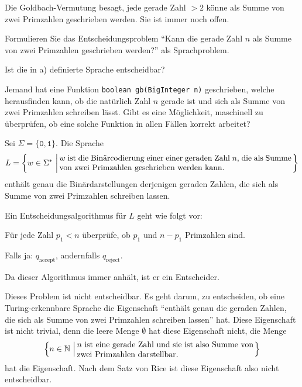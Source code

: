 Die Goldbach-Vermutung besagt, jede gerade Zahl $> 2$ könne als Summe von
zwei Primzahlen geschrieben werden. Sie ist immer noch offen.
\begin{teilaufgaben}
\item Formulieren Sie das Entscheidungsproblem ``Kann die gerade Zahl $n$
als Summe von zwei Primzahlen geschrieben werden?'' als Sprachproblem.
\item Ist die in a) definierte Sprache entscheidbar?
\item Jemand hat eine Funktion \texttt{boolean gb(BigInteger n)} geschrieben,
welche herausfinden kann, ob die natürlich Zahl $n$ gerade ist und sich
als Summe von zwei Primzahlen schreiben lässt. Gibt es eine Möglichkeit,
maschinell zu überprüfen, ob eine solche Funktion in allen Fällen
korrekt arbeitet?
\end{teilaufgaben}


\begin{loesung}
\begin{teilaufgaben}
\item Sei $\Sigma=\{\texttt{0},\texttt{1}\}$. Die Sprache
\[
L=\left\{ w\in\Sigma^*\,\left|\, \begin{minipage}{4truein}
$w$ ist die Binärcodierung einer einer geraden Zahl $n$, die
als Summe von zwei Primzahlen geschrieben werden kann.
\end{minipage}
\right.\right\}
\]
enthält genau die Binärdarstellungen derjenigen geraden Zahlen,
die sich als Summe von zwei Primzahlen schreiben lassen.
\item Ein Entscheidungsalgorithmus für $L$ geht wie folgt vor:
\begin{compactenum}
\item Für jede Zahl $p_1<n$ überprüfe, ob $p_1$ und $n-p_1$ Primzahlen
sind.
\item Falls ja: $q_{\text{accept}}$, andernfalls $q_{\text{reject}}$.
\end{compactenum}
Da dieser Algorithmus immer anhält, ist er ein Entscheider.
\item Dieses Problem ist nicht entscheidbar.
Es geht darum, zu entscheiden, ob eine Turing-erkennbare Sprache
die Eigenschaft
``enthält genau die geraden Zahlen, die sich als Summe von zwei Primzahlen
schreiben lassen''
hat.
Diese Eigenschaft ist nicht trivial, denn die leere Menge $\emptyset$ hat
diese Eigenschaft nicht, die Menge
\[
\left\{ n\in\mathbb N\,\left|\,
\begin{minipage}{3truein}
$n$ ist eine gerade Zahl und sie ist also Summe von zwei Primzahlen
darstellbar.
\end{minipage}\right.\right\}
\]
hat die Eigenschaft.
Nach dem Satz von Rice ist diese Eigenschaft also nicht entscheidbar.
\qedhere
\end{teilaufgaben}
\end{loesung}

